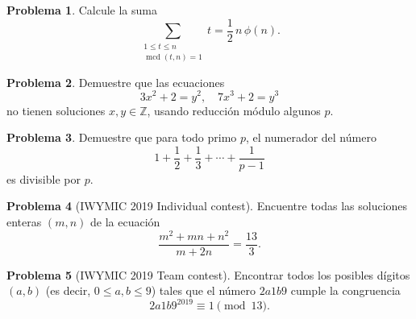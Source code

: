 \documentclass{article}
\newcommand{\ZZ}{\mathbb{Z}}
\DeclareMathOperator{\mcd}{mcd}
\theoremstyle{definition}
\newtheorem{problema}{Problema}
\begin{document}
\begin{problema}
  Calcule la suma
  $$\sum_{\substack{1 \le t \le n \\ \mcd (t,n) = 1}} t = \frac{1}{2}\,n\,\phi(n).$$
\end{problema}

\begin{problema}
  Demuestre que las ecuaciones
  $$3x^2 + 2 = y^2, \quad 7x^3 + 2 = y^3$$
  no tienen soluciones $x,y \in \ZZ$, usando reducción módulo algunos $p$.
\end{problema}

\begin{problema}
  Demuestre que para todo primo $p$, el numerador del número
  $$1 + \frac{1}{2} + \frac{1}{3} + \cdots + \frac{1}{p-1}$$
  es divisible por $p$.
\end{problema}

\begin{problema}[IWYMIC 2019 Individual contest]
  Encuentre todas las soluciones enteras $(m,n)$ de la ecuación
  $$\frac{m^2 + mn + n^2}{m + 2n} = \frac{13}{3}.$$
\end{problema}

\begin{problema}[IWYMIC 2019 Team contest]
  Encontrar todos los posibles dígitos $(a,b)$ (es decir, $0 \le a, b \le 9$)
  tales que el número $2a1b9$ cumple la congruencia
  $$2a1b9^{2019} \equiv 1 \pmod{13}.$$
\end{problema}
\end{document}
